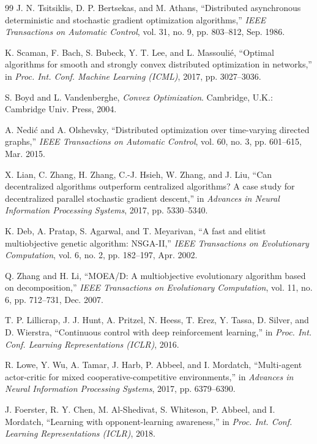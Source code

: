 \documentclass[conference]{IEEEtran}
\begin{document}
\begin{thebibliography}{99}
 J. N. Tsitsiklis, D. P. Bertsekas, and M. Athans, ``Distributed asynchronous deterministic and stochastic gradient optimization algorithms,'' \emph{IEEE Transactions on Automatic Control}, vol. 31, no. 9, pp. 803--812, Sep. 1986.

 K. Scaman, F. Bach, S. Bubeck, Y. T. Lee, and L. Massouli\'e, ``Optimal algorithms for smooth and strongly convex distributed optimization in networks,'' in \emph{Proc. Int. Conf. Machine Learning (ICML)}, 2017, pp. 3027--3036.

 S. Boyd and L. Vandenberghe, \emph{Convex Optimization}. Cambridge, U.K.: Cambridge Univ. Press, 2004.

 A. Nedi\'c and A. Olshevsky, ``Distributed optimization over time-varying directed graphs,'' \emph{IEEE Transactions on Automatic Control}, vol. 60, no. 3, pp. 601--615, Mar. 2015.

 X. Lian, C. Zhang, H. Zhang, C.-J. Hsieh, W. Zhang, and J. Liu, ``Can decentralized algorithms outperform centralized algorithms? A case study for decentralized parallel stochastic gradient descent,'' in \emph{Advances in Neural Information Processing Systems}, 2017, pp. 5330--5340.

 K. Deb, A. Pratap, S. Agarwal, and T. Meyarivan, ``A fast and elitist multiobjective genetic algorithm: NSGA-II,'' \emph{IEEE Transactions on Evolutionary Computation}, vol. 6, no. 2, pp. 182--197, Apr. 2002.

 Q. Zhang and H. Li, ``MOEA/D: A multiobjective evolutionary algorithm based on decomposition,'' \emph{IEEE Transactions on Evolutionary Computation}, vol. 11, no. 6, pp. 712--731, Dec. 2007.

 T. P. Lillicrap, J. J. Hunt, A. Pritzel, N. Heess, T. Erez, Y. Tassa, D. Silver, and D. Wierstra, ``Continuous control with deep reinforcement learning,'' in \emph{Proc. Int. Conf. Learning Representations (ICLR)}, 2016.

 R. Lowe, Y. Wu, A. Tamar, J. Harb, P. Abbeel, and I. Mordatch, ``Multi-agent actor-critic for mixed cooperative-competitive environments,'' in \emph{Advances in Neural Information Processing Systems}, 2017, pp. 6379--6390.

 J. Foerster, R. Y. Chen, M. Al-Shedivat, S. Whiteson, P. Abbeel, and I. Mordatch, ``Learning with opponent-learning awareness,'' in \emph{Proc. Int. Conf. Learning Representations (ICLR)}, 2018.


\end{thebibliography}
\end{document}
